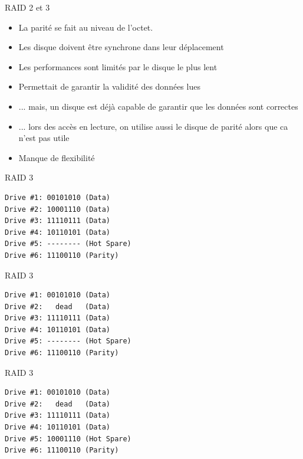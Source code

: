 \begin{frame}[fragile=singleslide]{RAID 2 et 3}
  \begin{itemize}
  \item La parité se fait au niveau de l'octet.
  \item Les disque doivent être synchrone dans leur déplacement
  \item Les performances sont limités par le disque le plus lent
  \item Permettait de garantir la validité des données lues
  \item  ... mais,  un disque  est déjà  capable de  garantir  que les
    données sont correctes
  \item ... lors  des accès en lecture, on utilise  aussi le disque de
    parité alors que ca n'est pas utile
  \item Manque de flexibilité
  \end{itemize}
\end{frame}

\begin{frame}[fragile=singleslide]{RAID 3}
  \begin{lstlisting}
Drive #1: 00101010 (Data)
Drive #2: 10001110 (Data)
Drive #3: 11110111 (Data)
Drive #4: 10110101 (Data)
Drive #5: -------- (Hot Spare)
Drive #6: 11100110 (Parity)
  \end{lstlisting}
\end{frame}

\begin{frame}[fragile=singleslide]{RAID 3}
  \begin{lstlisting}
Drive #1: 00101010 (Data)
Drive #2:   dead   (Data)
Drive #3: 11110111 (Data)
Drive #4: 10110101 (Data)
Drive #5: -------- (Hot Spare)
Drive #6: 11100110 (Parity)
\end{lstlisting}
\end{frame}

\begin{frame}[fragile=singleslide]{RAID 3}
  \begin{lstlisting}
Drive #1: 00101010 (Data)
Drive #2:   dead   (Data)
Drive #3: 11110111 (Data)
Drive #4: 10110101 (Data)
Drive #5: 10001110 (Hot Spare)
Drive #6: 11100110 (Parity)
\end{lstlisting}
\end{frame}

